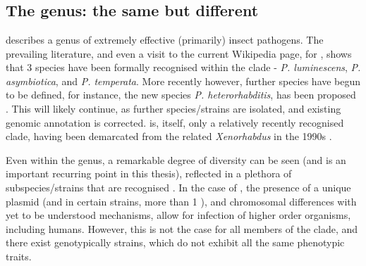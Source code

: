 \section{\Pa}

\subsection{The \Pa{} genus: the same but different}
\Pa{} describes a genus of extremely effective (primarily) insect pathogens. The prevailing literature, and even a visit to the current Wikipedia page, for \Pa{}, shows that 3 species have been formally recognised within the clade - \textit{P. luminescens}, \textit{P. asymbiotica}, and \textit{P. temperata}. More recently however, further species have begun to be defined, for instance, the new species \textit{P. heterorhabditis}, has been proposed \citep{Naidoo2015}. This will likely continue, as further species/strains are isolated, and existing genomic annotation is corrected. \Pa{} is, itself, only a relatively recently recognised clade, having been demarcated from the related \textit{Xenorhabdus} in the 1990s \citep{Saux1999a,Boemare1993}.

Even within the genus, a remarkable degree of diversity can be seen (and is an important recurring point in this thesis), reflected in a plethora of subspecies/strains that are recognised \citep{Peat2010}. In the case of \Pasy, the presence of a unique plasmid (and in certain strains, more than 1 \citep{Wilkinson2010a}), and chromosomal differences with yet to be understood mechanisms, allow for infection of higher order organisms, including humans. However, this is not the case for all members of the \Pasy{} clade, and there exist genotypically \Pasy{} strains, which do not exhibit all the same phenotypic traits.

